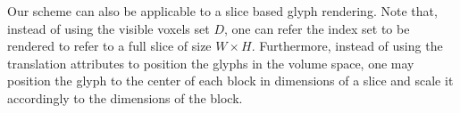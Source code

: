 \documentclass[twoside,twocolumn,10pt]{article}
\begin{document}
Our scheme can also be applicable to a slice based glyph rendering. Note that, instead of using the visible voxels set $D$, one can refer the index set to be rendered to refer to a full slice of size $W \times H$. Furthermore, instead of using the translation attributes to position the glyphs in the volume space, one may position the glyph to the center of each block in dimensions of a slice and scale it accordingly to the dimensions of the block.









 


\end{document}
